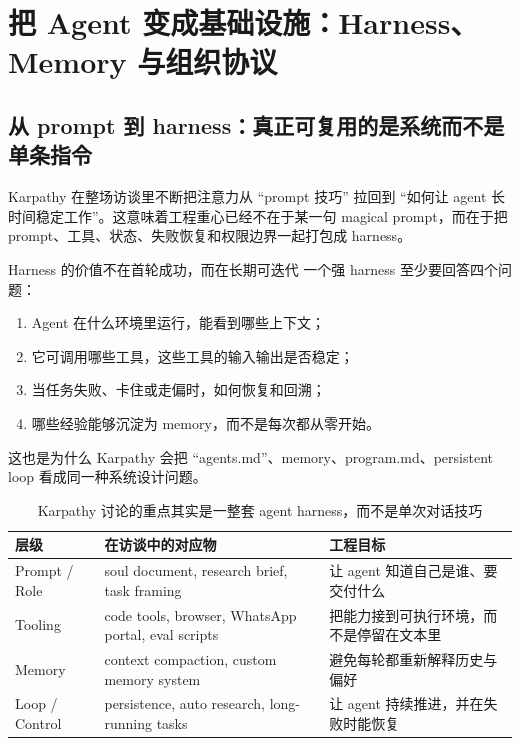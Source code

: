 \section{把 Agent 变成基础设施：Harness、Memory 与组织协议}

\subsection{从 prompt 到 harness：真正可复用的是系统而不是单条指令}
Karpathy 在整场访谈里不断把注意力从 ``prompt 技巧'' 拉回到 ``如何让 agent 长时间稳定工作''。这意味着工程重心已经不在于某一句 magical prompt，而在于把 prompt、工具、状态、失败恢复和权限边界一起打包成 harness。

\begin{importantbox}{Harness 的价值不在首轮成功，而在长期可迭代}
一个强 harness 至少要回答四个问题：
\begin{enumerate}
    \item Agent 在什么环境里运行，能看到哪些上下文；
    \item 它可调用哪些工具，这些工具的输入输出是否稳定；
    \item 当任务失败、卡住或走偏时，如何恢复和回溯；
    \item 哪些经验能够沉淀为 memory，而不是每次都从零开始。
\end{enumerate}
这也是为什么 Karpathy 会把 ``agents.md''、memory、program.md、persistent loop 看成同一种系统设计问题。
\end{importantbox}

\begin{table}[H]
\centering
\begin{tabular}{p{2.6cm}p{4.1cm}p{5.2cm}}
\toprule
\textbf{层级} & \textbf{在访谈中的对应物} & \textbf{工程目标} \\
\midrule
Prompt / Role & soul document, research brief, task framing & 让 agent 知道自己是谁、要交付什么 \\
Tooling & code tools, browser, WhatsApp portal, eval scripts & 把能力接到可执行环境，而不是停留在文本里 \\
Memory & context compaction, custom memory system & 避免每轮都重新解释历史与偏好 \\
Loop / Control & persistence, auto research, long-running tasks & 让 agent 持续推进，并在失败时能恢复 \\
\bottomrule
\end{tabular}
\caption{Karpathy 讨论的重点其实是一整套 agent harness，而不是单次对话技巧}
\end{table}


